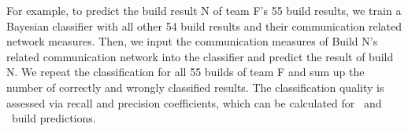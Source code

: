 For example, to predict the build result N of team F's 55 build results, we train
a Bayesian classifier with all other 54 build results and their communication
related network measures. Then, we input the communication measures of Build N's
related communication network into the classifier and predict the result of build
N. We repeat the classification for all 55 builds of team F and sum up the number
of correctly and wrongly classified results.
%
%
%
The classification quality is assessed via recall and precision coefficients,
which can be calculated for \error\ and \ok\ build  predictions. 
%
% 


